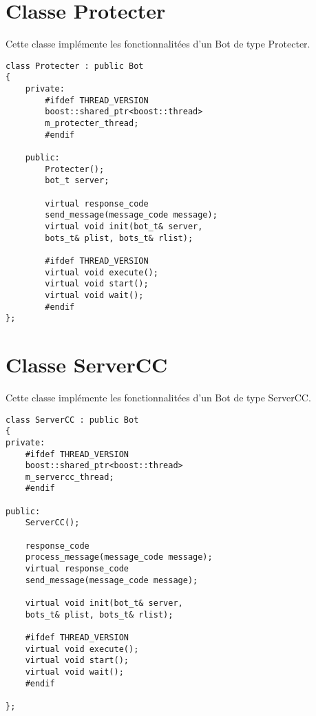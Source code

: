 \documentclass[11pt]{article}
\begin{document}
\newpage
\section{Classe Protecter}
Cette classe implémente les fonctionnalitées d'un Bot de type Protecter.\\

\begin{minipage}[c]{.46\linewidth}
\begin{verbatim} 
class Protecter : public Bot
{	
	private:
		#ifdef THREAD_VERSION
		boost::shared_ptr<boost::thread> 
		m_protecter_thread;
		#endif
		
	public:
		Protecter();
		bot_t server;
	
		virtual response_code 
		send_message(message_code message);
		virtual void init(bot_t& server, 
		bots_t& plist, bots_t& rlist);
		
		#ifdef THREAD_VERSION
		virtual void execute();
        virtual void start();
        virtual void wait();
		#endif
};
\end{verbatim}	
\end{minipage} \hfill
\begin{minipage}[c]{.46\linewidth}

\end{minipage}

\newpage
\section{Classe ServerCC}
Cette classe implémente les fonctionnalitées d'un Bot de type ServerCC.\\

\begin{minipage}[c]{.46\linewidth}
\begin{verbatim} 
class ServerCC : public Bot
{
private:
	#ifdef THREAD_VERSION
	boost::shared_ptr<boost::thread> 
	m_servercc_thread;
	#endif	 

public:
	ServerCC();
	
	response_code 
	process_message(message_code message);
	virtual response_code 
	send_message(message_code message);
	
	virtual void init(bot_t& server, 
	bots_t& plist, bots_t& rlist);

	#ifdef THREAD_VERSION
	virtual void execute();
	virtual void start();
	virtual void wait();
	#endif

};
\end{verbatim}	
\end{minipage} \hfill
\begin{minipage}[c]{.46\linewidth}

\end{minipage}
\newpage
\end{document}
